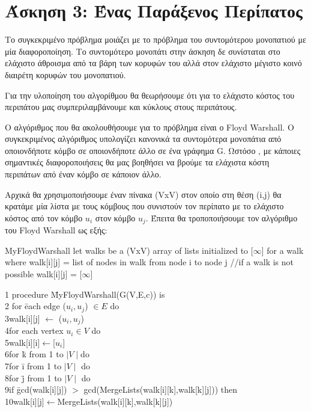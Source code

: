 \documentclass[12pt,a4paper]{article}
\begin{document}
\section*{Άσκηση 3: Ένας Παράξενος Περίπατος }

Το συγκεκριμένο πρόβλημα μοιάζει με το πρόβλημα του συντομότερου μονοπατιού με μία διαφοροποίηση. Το συντομότερο μονοπάτι στην άσκηση δε συνίσταται στο ελάχιστο άθροισμα από τα βάρη των κορυφών του αλλά στον ελάχιστο μέγιστο κοινό διαιρέτη κορυφών του μονοπατιού. \\
\par
Για την υλοποίηση του αλγορίθμου θα θεωρήσουμε ότι για το ελάχιστο κόστος του περιπάτου μας συμπεριλαμβάνουμε και κύκλους στους περιπάτους.\\
\par 
Ο αλγόριθμος που θα ακολουθήσουμε για το πρόβλημα είναι ο Floyd Warshall. Ο συγκεκριμένος αλγόριθμος υπολογίζει κανονικά τα συντομότερα μονοπάτια από οποιονδήποτε κόμβο σε οποιονδήποτε άλλο σε ένα γράφημα G. Ωστόσο , με κάποιες σημαντικές διαφοροποιήσεις θα μας βοηθήσει να βρούμε τα ελάχιστα κόστη περιπάτων από έναν κόμβο σε κάποιον άλλο.\\
\par Αρχικά θα χρησιμοποιήσουμε έναν πίνακα (VxV) στον οποίο στη θέση (i,j) θα κρατάμε μία λίστα με τους κόμβους που συνιστούν τον περίπατο με το ελάχιστο κόστος από τον κόμβο $u_i$ στον κόμβο $u_j$. Έπειτα θα τροποποιήσουμε τον αλγόριθμο του Floyd Warshall ως εξής:
\begin{mybox}{MyFloydWarshall}
let walks be a (VxV) array of lists initialized to [$\infty$] for a walk where walk[i][j] = list of nodes in walk from node i to node j //if a walk is not possible walk[i][j] = [$\infty$] 
\begin{tabbing}
 1 procedure \= MyFloydWarshall(G(V,E,c)) is \\
 2 \>for \= each edge ($u_i,u_j$) $\in E$ do \\
 3\>\>walk[i][j] $\leftarrow$ ($u_i,u_j$) \\
 4\>for each vertex $u_i \in V$ do\\
 5\>\>walk[i][i]$\leftarrow$[$u_i$]\\
 6\>for \=k from 1 to $\mid V \mid $do \\
 7\>\>for \=i from 1 to $\mid V \mid$ do \\
 8\>\>\>for \=j from 1 to $\mid V \mid$ do \\
 9\>\>\>\>if \=gcd(walk[i][j]) $>$ gcd(MergeLists(walk[i][k],walk[k][j])) then\\
 10\>\>\>\>\>walk[i][j]$\leftarrow$MergeLists(walk[i][k],walk[k][j])
\end{tabbing}
\end{mybox}
\end{document}
